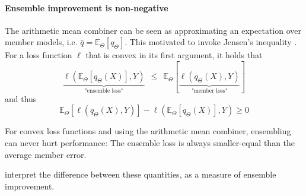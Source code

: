 \documentclass[
    a4paper, %
	fontsize=10pt, %
	twoside=false, %
]{kaobook}
\begin{document}
\paragraph{Ensemble improvement is non-negative} The arithmetic mean combiner can be seen as approximating an expectation over member models, i.e. $\bar{q} = \mathbb{E}_{\Theta} \left[q_{\Theta}\right]$.
This motivated \cite{abe} to invoke Jensen's inequality
. For a loss function $\ell$ that is convex in its first argument, it holds that
$$
\underbrace{
\ell(\mathbb{E}_{\Theta}\left[ q_{\Theta}(X)\right] , Y  ) 
}_{\text{"ensemble loss"}}
~ ~ \leq ~ ~ 
\mathbb{E}_{\Theta}\left[ 
\underbrace{
\ell(q_{\Theta}(X), Y)  
}_{\text{"member loss"}}
\right]
$$
and thus
$$
\mathbb{E}_{{\Theta}}\left[ \ell (q_{\Theta}(X),Y) \right]  -
\ell(\mathbb{E}_{\Theta}\left[ q_{\Theta}(X) \right] ,Y ) \geq 0
$$
\begin{corollary}
  For convex loss functions and using the arithmetic mean combiner, ensembling can never hurt performance: The ensemble loss is always smaller-equal than the average member error.
\end{corollary}
\cite{abe} interpret the difference between these quantities, as a measure of ensemble improvement. 
\end{document}

